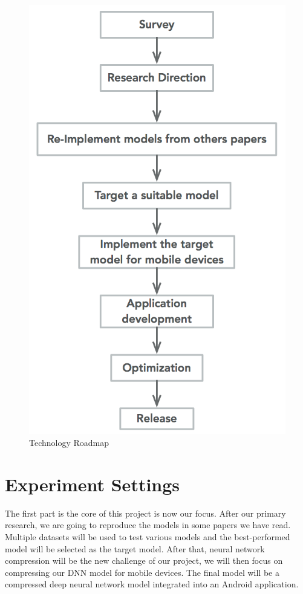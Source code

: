 \documentclass[a4paper, 12pt]{article}
\begin{document}
\begin{figure}[H]
\centering
\includegraphics[scale=0.5]{roadmap.png}
\caption{\label{fig:roadmap}Technology Roadmap}
\end{figure} 

\section{Experiment Settings}
The first part is the core of this project is now our focus. After our primary research, we are going to reproduce the models in some papers we have read. Multiple datasets will be used to test various models and the best-performed model will be selected as the target model. After that, neural network compression will be the new challenge of our project, we will then focus on compressing our DNN model for mobile devices. The final model will be a compressed deep neural network model integrated into an Android application.
\end{document}
